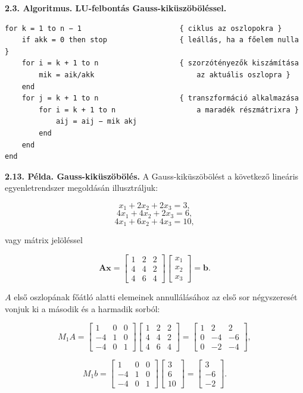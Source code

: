 \documentclass[
  magyar,
  11pt]{article}
\providecommand{\boldsymbol}[1]{\mathbf{#1}}
\begin{document}
\textbf{2.3. Algoritmus. LU-felbontás Gauss-kiküszöböléssel.}

\begin{verbatim}
for k = 1 to n − 1                       { ciklus az oszlopokra }
    if akk = 0 then stop                 { leállás, ha a főelem nulla }
    for i = k + 1 to n                   { szorzótényezők kiszámítása
        mik = aik/akk                        az aktuális oszlopra }
    end
    for j = k + 1 to n                   { transzformáció alkalmazása
        for i = k + 1 to n                   a maradék részmátrixra }
            aij = aij − mik akj
        end
    end
end
\end{verbatim}

\textbf{2.13. Példa. Gauss-kiküszöbölés.} A Gauss-kiküszöbölést a
következő lineáris egyenletrendszer megoldásán illusztráljuk:

\[x_1 + 2x_2 + 2x_3 = 3,\] \[4x_1 + 4x_2 + 2x_3 = 6,\]
\[4x_1 + 6x_2 + 4x_3 = 10,\]

vagy mátrix jelöléssel

\[\boldsymbol{A}\boldsymbol{x} = \begin{bmatrix} 1 & 2 & 2 \\ 4 & 4 & 2 \\ 4 & 6 & 4 \end{bmatrix} \begin{bmatrix} x_1 \\ x_2 \\ x_3 \end{bmatrix} = \boldsymbol{b}.\]

\(A\) első oszlopának főátló alatti elemeinek annullálásához az első sor
négyszeresét vonjuk ki a második és a harmadik sorból:

\[M_1 A = \begin{bmatrix} 1 & 0 & 0 \\ -4 & 1 & 0 \\ -4 & 0 & 1 \end{bmatrix} \begin{bmatrix} 1 & 2 & 2 \\ 4 & 4 & 2 \\ 4 & 6 & 4 \end{bmatrix} = \begin{bmatrix} 1 & 2 & 2 \\ 0 & -4 & -6 \\ 0 & -2 & -4 \end{bmatrix},\]

\[M_1 b = \begin{bmatrix} 1 & 0 & 0 \\ -4 & 1 & 0 \\ -4 & 0 & 1 \end{bmatrix} \begin{bmatrix} 3 \\ 6 \\ 10 \end{bmatrix} = \begin{bmatrix} 3 \\ -6 \\ -2 \end{bmatrix}.\]
\end{document}
